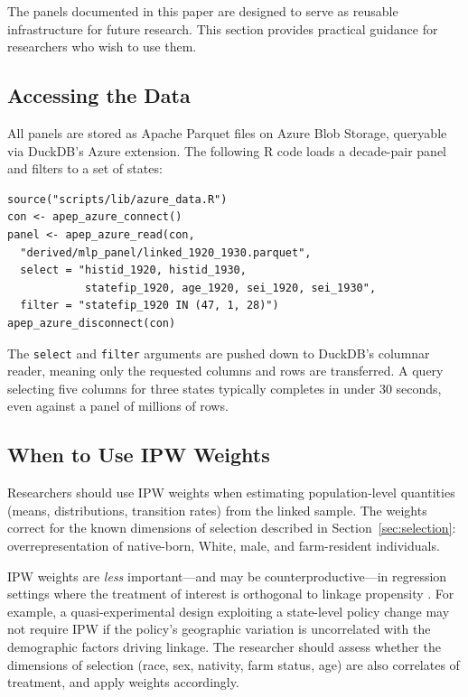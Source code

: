 \documentclass[12pt]{article}
\begin{document}
The panels documented in this paper are designed to serve as reusable infrastructure for future research. This section provides practical guidance for researchers who wish to use them.

\subsection{Accessing the Data}

All panels are stored as Apache Parquet files on Azure Blob Storage, queryable via DuckDB's Azure extension. The following R code loads a decade-pair panel and filters to a set of states:

\begin{verbatim}
source("scripts/lib/azure_data.R")
con <- apep_azure_connect()
panel <- apep_azure_read(con,
  "derived/mlp_panel/linked_1920_1930.parquet",
  select = "histid_1920, histid_1930,
            statefip_1920, age_1920, sei_1920, sei_1930",
  filter = "statefip_1920 IN (47, 1, 28)")
apep_azure_disconnect(con)
\end{verbatim}

The \texttt{select} and \texttt{filter} arguments are pushed down to DuckDB's columnar reader, meaning only the requested columns and rows are transferred. A query selecting five columns for three states typically completes in under 30 seconds, even against a panel of millions of rows.

\subsection{When to Use IPW Weights}

Researchers should use IPW weights when estimating population-level quantities (means, distributions, transition rates) from the linked sample. The weights correct for the known dimensions of selection described in Section~\ref{sec:selection}: overrepresentation of native-born, White, male, and farm-resident individuals.

IPW weights are \textit{less} important---and may be counterproductive---in regression settings where the treatment of interest is orthogonal to linkage propensity \citep{bailey2020}. For example, a quasi-experimental design exploiting a state-level policy change may not require IPW if the policy's geographic variation is uncorrelated with the demographic factors driving linkage. The researcher should assess whether the dimensions of selection (race, sex, nativity, farm status, age) are also correlates of treatment, and apply weights accordingly.
\end{document}
